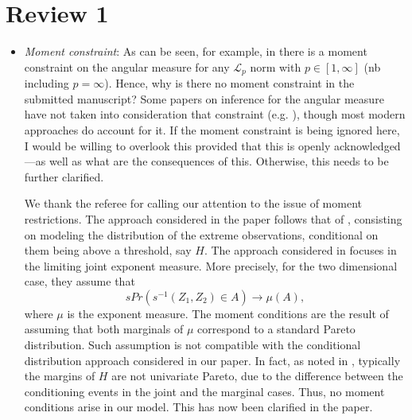 \documentclass[10pt]{article}
\newcommand{\comment}[1]{\textcolor{teal}{#1}}
\begin{document}
\section*{Review 1}
\begin{itemize}
\item \emph{Moment constraint}: As can be seen, for example, in \cite[Equation 4.1]{einmahl2009}
    there is a moment constraint on the angular measure for any $\mathcal{L}_p$ norm with 
    $p \in [1, \infty]$ (nb including $p = \infty$).  Hence, why is there no moment constraint in 
    the submitted 
    manuscript? Some papers on inference for the angular measure have not taken into consideration 
    that constraint (e.g. \cite{einmahl2001}), though most modern approaches do account for it. If 
    the moment constraint is being ignored here, I would be willing to overlook this provided that 
    this is openly acknowledged---as well as what are the consequences of this. Otherwise, this needs 
    to be further clarified.

    
We thank the referee for calling our attention to
    the issue of moment restrictions. The approach considered in the
    paper follows that of \cite{rootzen2018}, consisting on modeling the
    distribution of the extreme observations, conditional on them being
    above a threshold, say $H$.  The approach considered in
    \cite{EiSe2009} focuses in the limiting joint exponent measure. More
    precisely, for the two dimensional case, they assume that
    \[
        sPr(s^{-1}(Z_1,Z_2) \in A) \rightarrow \mu(A),
    \]
    where $\mu$ is the exponent measure. The moment conditions are
    the result of assuming that both marginals of $\mu$ correspond to a
    standard Pareto distribution. Such assumption is not compatible
    with the conditional distribution approach considered in our paper.
    In fact, as noted in \cite{KiRoSeWa2019}, typically the margins of
    $H$ are not univariate Pareto, due to the difference between the 
    conditioning events in the joint and the marginal cases. Thus, no
    moment conditions arise in our model. This has now been clarified in the paper.


\end{itemize}
\end{document}
